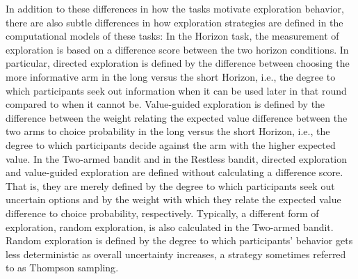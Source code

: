 \documentclass[fleqn,10pt]{wlscirep}
\begin{document}
In addition to these differences in how the tasks motivate exploration behavior, there are also subtle differences in how exploration strategies are defined in the computational models of these tasks: In the Horizon task, the measurement of exploration is based on a difference score between the two horizon conditions. In particular, directed exploration is defined by the difference between choosing the more informative arm in the long versus the short Horizon, i.e., the degree to which participants seek out information when it can be used later in that round compared to when it cannot be. Value-guided exploration is defined by the difference between the weight relating the expected value difference between the two arms to choice probability in the long versus the short Horizon, i.e., the degree to which participants decide against the arm with the higher expected value. In the Two-armed bandit and in the Restless bandit, directed exploration and value-guided exploration are defined without calculating a difference score. That is, they are merely defined by the degree to which participants seek out uncertain options and by the weight with which they relate the expected value difference to choice probability, respectively. Typically, a different form of exploration, random exploration, is also calculated in the Two-armed bandit. Random exploration is defined by the degree to which participants' behavior gets less deterministic as overall uncertainty increases, a strategy sometimes referred to as Thompson sampling\cite{gershman_deconstructing_2018}.
\end{document}
